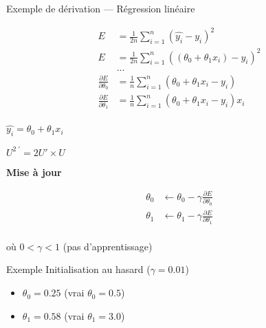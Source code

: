\begin{frame}{Exemple de dérivation --- Régression linéaire}
  \begin{minipage}[l]{0.49\linewidth}
    \begin{align*}
      E & = \frac{1}{2n} \sum_{i=1}^n( \hat{y_i} - y_i )^2 \\
      E & = \frac{1}{2n}\sum_{i=1}^n( (\theta_0 + \theta_1 x_i) - y_i )^2 \\
      & ... \\
      \frac{\partial E}{\partial \theta_0} & = \frac{1}{n}\sum^n_{i=1}(\theta_0 + \theta_1 x_i - y_i) \\
      \frac{\partial E}{\partial \theta_1} & = \frac{1}{n}\sum^n_{i=1}(\theta_0 + \theta_1 x_i - y_i) x_i \\
    \end{align*}
  \end{minipage}\hfill
  \begin{minipage}[c]{0.49\linewidth}
    \begin{center}
      $\boxed{\hat{y_i} = \theta_0 + \theta_1 x_i}$
    \end{center}

    \begin{center}
      $\boxed{U^{2\;\prime}=2U' \times U}$
    \end{center}

    \begin{center}
      \textbf{Mise à jour}

      \begin{align*}
        \theta_0 & \leftarrow \theta_0 - \gamma\frac{\partial{E}}{\partial{\theta_0}} \\
        \theta_1 & \leftarrow \theta_1 - \gamma\frac{\partial{E}}{\partial{\theta_1}} \\
      \end{align*}

      où $0 < \gamma < 1$ (pas d'apprentissage)
    \end{center}
  \end{minipage}\hfill
\end{frame}

\begin{frame}{Exemple}
  Initialisation au hasard ($\gamma = 0.01$)
  \begin{itemize}
    \item $\theta_0 = 0.25$ (vrai $\theta_0 = 0.5$)
    \item $\theta_1 = 0.58$ (vrai $\theta_1 = 3.0$)
  \end{itemize}
\end{frame}

